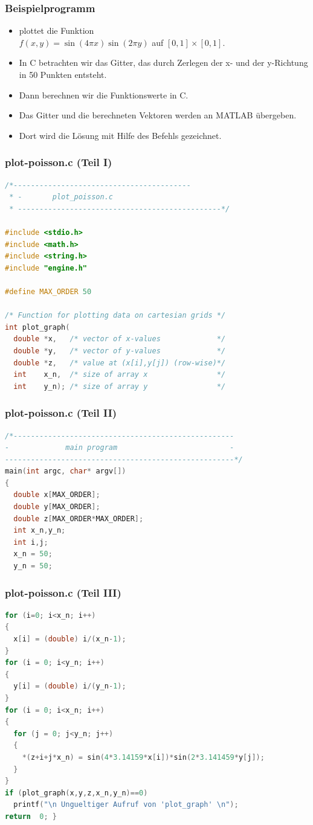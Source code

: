\documentclass[hyperref={xetex}]{beamer}
\begin{document}
%
%
\begin{frame}[fragile]\frametitle{Beispielprogramm}
\begin{itemize}
\item {} plottet die Funktion\\
$f(x,y)= \sin(4 \pi x) \sin (2 \pi y)$
auf $[0,1] \times [0,1]$.
\item In C betrachten wir das Gitter, das durch Zerlegen der x- und der
y-Richtung in 50 Punkten entsteht. 
\item Dann berechnen wir die Funktionswerte in C.
\item Das Gitter und die berechneten Vektoren werden an MATLAB \"ubergeben.
\item Dort wird die L\"osung mit Hilfe des Befehls  gezeichnet.
\end{itemize}
\end{frame}
%
%
\begin{frame}[fragile]\frametitle{plot-poisson.c (Teil I)}
\begin{lstlisting}[language=C++]
/*-----------------------------------------
 * -       plot_poisson.c
 * -----------------------------------------------*/

#include <stdio.h>
#include <math.h>
#include <string.h>
#include "engine.h"

#define MAX_ORDER 50

/* Function for plotting data on cartesian grids */
int plot_graph(
  double *x,   /* vector of x-values             */
  double *y,   /* vector of y-values             */
  double *z,   /* value at (x[i],y[j]) (row-wise)*/
  int    x_n,  /* size of array x                */
  int    y_n); /* size of array y                */
\end{lstlisting}
\end{frame}
%
%
\begin{frame}[fragile]\frametitle{plot-poisson.c (Teil II)}
\begin{lstlisting}[language=C++]
/*---------------------------------------------------
-             main program                          -     
-----------------------------------------------------*/
main(int argc, char* argv[]) 
{
  double x[MAX_ORDER];
  double y[MAX_ORDER];
  double z[MAX_ORDER*MAX_ORDER];
  int x_n,y_n;
  int i,j;        
  x_n = 50;
  y_n = 50;
\end{lstlisting}
\end{frame}
%
%
\begin{frame}[fragile]\frametitle{plot-poisson.c (Teil III)}
\begin{lstlisting}[language=C++]  
for (i=0; i<x_n; i++)
{
  x[i] = (double) i/(x_n-1);
}
for (i = 0; i<y_n; i++)
{
  y[i] = (double) i/(y_n-1);
}
for (i = 0; i<x_n; i++) 
{
  for (j = 0; j<y_n; j++)
  {
    *(z+i+j*x_n) = sin(4*3.14159*x[i])*sin(2*3.141459*y[j]);
  }
}      
if (plot_graph(x,y,z,x_n,y_n)==0) 
  printf("\n Ungueltiger Aufruf von 'plot_graph' \n");
return  0; }
\end{lstlisting}
\end{frame}
\end{document}
